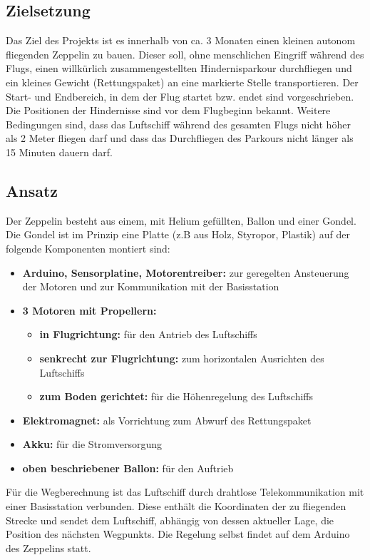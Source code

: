 \documentclass[lang=ngerman,inputenc=utf8,fontsize=10pt]{ldvarticle}
\begin{document}
\subsection*{Zielsetzung}
Das Ziel des Projekts ist es innerhalb von ca. 3 Monaten einen kleinen autonom fliegenden Zeppelin zu bauen. Dieser soll, ohne menschlichen Eingriff während des Flugs, einen willkürlich zusammengestellten Hindernisparkour durchfliegen und ein kleines Gewicht (Rettungspaket) an eine markierte Stelle transportieren. Der Start- und Endbereich, in dem der Flug startet bzw. endet sind vorgeschrieben. Die Positionen der Hindernisse sind vor dem Flugbeginn bekannt. Weitere Bedingungen sind, dass das Luftschiff während des gesamten Flugs nicht höher als 2 Meter fliegen darf und dass das Durchfliegen des Parkours nicht länger als 15 Minuten dauern darf. 

\subsection*{Ansatz}
Der Zeppelin besteht aus einem, mit Helium gefüllten, Ballon und einer Gondel. Die Gondel ist im Prinzip eine Platte (z.B aus Holz, Styropor, Plastik) auf der  folgende Komponenten montiert sind:
\begin{itemize}
	\item \textbf{Arduino, Sensorplatine, Motorentreiber:} zur geregelten Ansteuerung der Motoren und zur Kommunikation mit der Basisstation
	\item \textbf{3 Motoren mit Propellern:}
		\begin{itemize}
			\item \textbf{in Flugrichtung:} für den Antrieb des Luftschiffs
			\item \textbf{senkrecht zur Flugrichtung:} zum horizontalen Ausrichten des Luftschiffs
			\item \textbf{zum Boden gerichtet:} für die Höhenregelung des Luftschiffs
		\end{itemize}
	\item \textbf{Elektromagnet:} als Vorrichtung zum Abwurf des Rettungspaket
	\item \textbf{Akku:} für die Stromversorgung
	\item \textbf{oben beschriebener Ballon:} für den Auftrieb
\end{itemize}

Für die Wegberechnung ist das Luftschiff durch drahtlose Telekommunikation mit einer Basisstation verbunden. Diese enthält die Koordinaten der zu fliegenden Strecke und sendet dem Luftschiff, abhängig von dessen aktueller Lage, die Position des nächsten Wegpunkts. Die Regelung selbst findet auf dem Arduino des Zeppelins statt.
\end{document}
